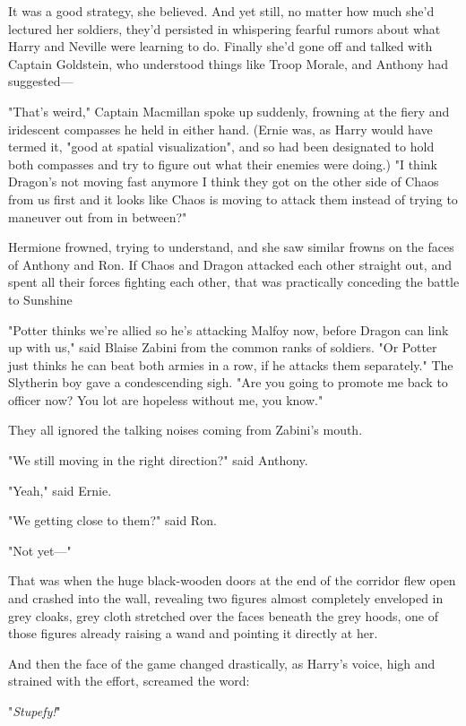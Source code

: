 It was a good strategy, she believed. And yet still, no matter how much she'd
lectured her soldiers, they'd persisted in whispering fearful rumors about what
Harry and Neville were learning to do. Finally she'd gone off and talked with
Captain Goldstein, who understood things like Troop Morale, and Anthony had
suggested---

"That's weird," Captain Macmillan spoke up suddenly, frowning at the fiery and
iridescent compasses he held in either hand. (Ernie was, as Harry would have
termed it, "good at spatial visualization", and so had been designated to hold
both compasses and try to figure out what their enemies were doing.) "I
think{\el} Dragon's not moving fast anymore{\el} I think they got on the
other side of Chaos from us first{\el} and it looks like Chaos is moving to
attack them instead of trying to maneuver out from in between?"

Hermione frowned, trying to understand, and she saw similar frowns on the faces
of Anthony and Ron. If Chaos and Dragon attacked each other straight out, and
spent all their forces fighting each other, that was practically conceding the
battle to \mbox{Sunshine}{\el}

"Potter thinks we're allied so he's attacking Malfoy now, before Dragon can
link up with us," said Blaise Zabini from the common ranks of soldiers. "Or
Potter just thinks he can beat both armies in a row, if he attacks them
separately." The Slytherin boy gave a condescending sigh. "Are you going to
promote me back to officer now? You lot are hopeless without me, you know."

They all ignored the talking noises coming from Zabini's mouth.

"We still moving in the right direction?" said Anthony.

"Yeah," said Ernie.

"We getting close to them?" said Ron.

"Not yet\mbox{---}"

That was when the huge black-wooden doors at the end of the corridor flew open
and crashed into the wall, revealing two figures almost completely enveloped in
grey cloaks, grey cloth stretched over the faces beneath the grey hoods, one of
those figures already raising a wand and pointing it directly at her.

And then the face of the game changed drastically, as Harry's voice, high and
strained with the effort, screamed the word:

"\emph{Stupefy!}"

